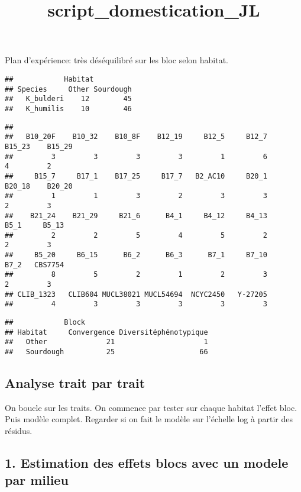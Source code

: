 \documentclass[
]{article}
\title{script\_domestication\_JL}
\author{}
\date{\vspace{-2.5em}}
\begin{document}
\maketitle

Plan d'expérience: très déséquilibré sur les bloc selon habitat.

\begin{verbatim}
##            Habitat
## Species     Other Sourdough
##   K_bulderi    12        45
##   K_humilis    10        46
\end{verbatim}

\begin{verbatim}
## 
##   B10_20F    B10_32    B10_8F    B12_19     B12_5     B12_7    B15_23    B15_29 
##         3         3         3         3         1         6         4         2 
##     B15_7     B17_1    B17_25     B17_7   B2_AC10     B20_1    B20_18    B20_20 
##         1         1         3         2         3         3         2         3 
##    B21_24    B21_29     B21_6      B4_1     B4_12     B4_13      B5_1     B5_13 
##         2         2         5         4         5         2         2         3 
##     B5_20     B6_15      B6_2      B6_3      B7_1     B7_10      B7_2   CBS7754 
##         8         5         2         1         2         3         2         3 
## CLIB_1323   CLIB604 MUCL38021 MUCL54694  NCYC2450   Y-27205 
##         4         3         3         3         3         3
\end{verbatim}

\begin{verbatim}
##            Block
## Habitat     Convergence Diversitéphénotypique
##   Other              21                     1
##   Sourdough          25                    66
\end{verbatim}

\hypertarget{analyse-trait-par-trait}{%
\subsection{Analyse trait par trait}\label{analyse-trait-par-trait}}

On boucle sur les traits. On commence par tester sur chaque habitat
l'effet bloc. Puis modèle complet. Regarder si on fait le modèle sur
l'échelle log à partir des résidus.

\hypertarget{estimation-des-effets-blocs-avec-un-modele-par-milieu}{%
\subsection{1. Estimation des effets blocs avec un modele par
milieu}\label{estimation-des-effets-blocs-avec-un-modele-par-milieu}}
\end{document}
